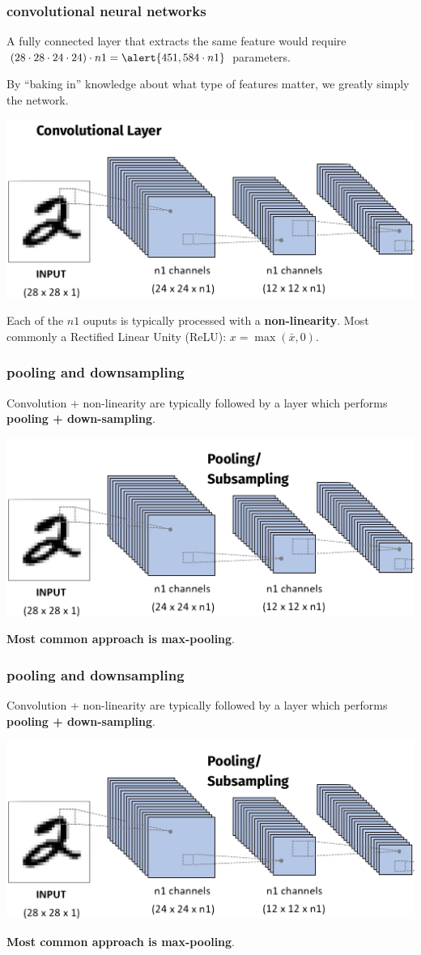 \documentclass[handout,compress]{beamer}
\begin{document}
	\begin{frame}
	\frametitle{convolutional neural networks}
	\small
	A fully connected layer that extracts the same feature would require $(28\cdot28\cdot24\cdot 24)\cdot n1 = \alert{451,584\cdot n1}$ parameters. 
	
	By ``baking in'' knowledge about what type of features matter, we greatly simply the network.

	\begin{center}
		\includegraphics[width=.7\textwidth]{conv_net1.png}
	\end{center}
	Each of the $n1$ ouputs is typically processed with a \textbf{non-linearity}. Most commonly a Rectified Linear Unity (ReLU): $x = \max(\bar{x},0)$. 
\end{frame}

	\begin{frame}
	\frametitle{pooling and downsampling}
	Convolution + non-linearity are typically followed by a layer which performs \textbf{pooling + down-sampling}.
	\begin{center}
		\includegraphics[width=.7\textwidth]{conv_net2.png}
	\end{center}
	\textbf{Most common approach is \alert{max-pooling}}.
	\end{frame}

	\begin{frame}
	\frametitle{pooling and downsampling}
	Convolution + non-linearity are typically followed by a layer which performs \textbf{pooling + down-sampling}.
	\begin{center}
		\includegraphics[width=.7\textwidth]{conv_net2.png}
		
		\textbf{Most common approach is \alert{max-pooling}}.
	\end{center}
	\end{frame}
\end{document}
